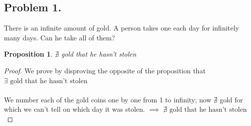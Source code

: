 \documentclass{article}
\newtheorem*{proposition}{Proposition}
\begin{document}
\subsection{Problem 1.}
There is an infinite amount of gold. A person takes one each day for infinitely many days. Can he take all of them?

\begin{proposition}
  $\nexists$ gold that he hasn't stolen
\end{proposition}
\begin{proof}
    We prove by disproving the opposite of the proposition that $\exists\text{ gold that he hasn't stolen}$
    \\ \\
    We number each of the gold coins one by one from 1 to infinity; now $\nexists$ gold for which we can't tell on which day it was stolen. $\implies$ $\nexists\text{ gold that he hasn't stolen}$

\end{proof}
\end{document}
